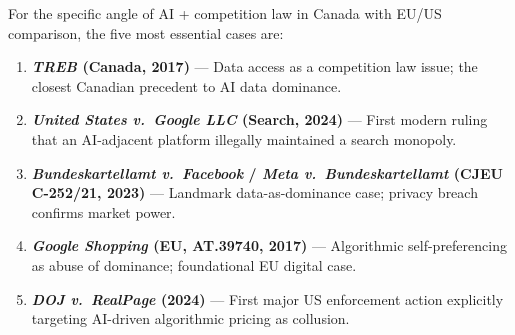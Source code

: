 \documentclass[12pt, letterpaper]{article}
\begin{document}
\noindent For the specific angle of AI + competition law in Canada with EU/US comparison, the five most essential cases are:

\begin{enumerate}
  \item \textbf{\textit{TREB} (Canada, 2017)} --- Data access as a competition law issue; the closest Canadian precedent to AI data dominance.
  \item \textbf{\textit{United States v.\ Google LLC} (Search, 2024)} --- First modern ruling that an AI-adjacent platform illegally maintained a search monopoly.
  \item \textbf{\textit{Bundeskartellamt v.\ Facebook} / \textit{Meta v.\ Bundeskartellamt} (CJEU C-252/21, 2023)} --- Landmark data-as-dominance case; privacy breach confirms market power.
  \item \textbf{\textit{Google Shopping} (EU, AT.39740, 2017)} --- Algorithmic self-preferencing as abuse of dominance; foundational EU digital case.
  \item \textbf{\textit{DOJ v.\ RealPage} (2024)} --- First major US enforcement action explicitly targeting AI-driven algorithmic pricing as collusion.
\end{enumerate}
\end{document}

